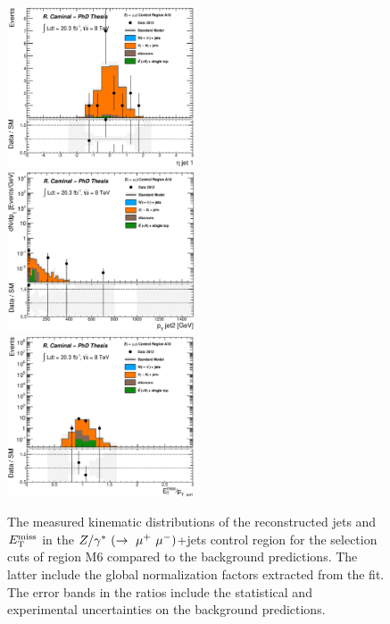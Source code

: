 \begin{figure}[!ht]
\begin{center}
{      \includegraphics[width=0.495\textwidth]{Appendix_FluctuationM6/Figures/plot_Stop_A10_CRzmm_eta1_fitted.eps}
    }
    \mbox{
      \includegraphics[width=0.495\textwidth]{Appendix_FluctuationM6/Figures/plot_Stop_A10_CRzmm_pt2_fitted.eps}
      \includegraphics[width=0.495\textwidth]{Appendix_FluctuationM6/Figures/plot_Stop_A10_CRzmm_metpt1_fitted.eps}
    }
  \end{center}
  \caption[Kinematic distributions of the reconstructed jets and $\met$ in the $\zmm$+jets control region for the selection cuts of region M6, after the normalization factors extracted from the fit have been applied.]{The measured kinematic distributions of the reconstructed jets and $\met$ in the $\zmm$+jets control region for the selection cuts of region M6 compared to the background predictions. The latter include the global normalization factors extracted from the fit. The error bands in the ratios include the statistical and experimental uncertainties on the background predictions.}
  \label{fig:Plot_M6_CRzmm_Jetkinematics}
\end{figure}


